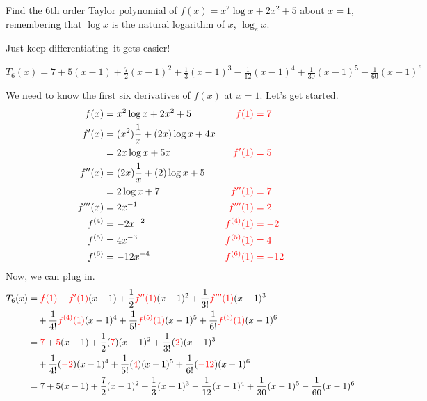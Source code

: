 \begin{Mquestion}
Find the 6th order Taylor polynomial of $f(x)=x^2\log x+2x^2+5$ about $x=1$, remembering that $\log x$ is the natural logarithm of $x$, $\log_ex$.
\end{Mquestion}
\begin{hint}
Just keep differentiating--it gets easier!
\end{hint}
\begin{answer}
$T_6(x)=7+5(x-1)+\frac{7}{2}(x-1)^2+\frac{1}{3}(x-1)^3-\frac{1}{12}(x-1)^4+\frac{1}{30}(x-1)^5-\frac{1}{60}(x-1)^6
$
\end{answer}
\begin{solution}
We need to know the first six derivatives of $f(x)$ at $x=1$. Let's get started.
\begin{align*}
f(x)&=x^2\log x + 2x^2+5 & \color{red}f(1)&\color{red}=7\\
f'(x)&=(x^2)\frac{1}{x}+(2x)\log x + 4x \\
&=2x\log x + 5x& \color{red}f'(1)&\color{red}=5\\
f''(x)&=(2x)\frac{1}{x}+(2)\log x + 5\\
&=2\log x + 7& \color{red}f''(1)&\color{red}=7\\
f'''(x)&=2x^{-1}& \color{red}f'''(1)&\color{red}=2\\
f^{(4)}&=-2x^{-2}& \color{red}f^{(4)}(1)&\color{red}=-2\\
f^{(5)}&=4x^{-3}& \color{red}f^{(5)}(1)&\color{red}=4\\
f^{(6)}&=-12x^{-4}& \color{red}f^{(6)}(1)&\color{red}=-12
\end{align*}
Now, we can plug in.
\begin{align*}
T_6(x)&=\textcolor{red}{f(1)}+\textcolor{red}{f'(1)}(x-1)+\frac{1}{2}\textcolor{red}{f''(1)}(x-1)^2+\frac{1}{3!}\textcolor{red}{f'''(1)}(x-1)^3\\
&\quad
+\frac{1}{4!}\textcolor{red}{f^{(4)}(1)}(x-1)^4
+\frac{1}{5!}\textcolor{red}{f^{(5)}(1)}(x-1)^5
+\frac{1}{6!}\textcolor{red}{f^{(6)}(1)}(x-1)^6\\
&=\textcolor{red}{7}+\textcolor{red}{5}(x-1)+\frac{1}{2}(\textcolor{red}{7})(x-1)^2
+\frac{1}{3!}(\textcolor{red}{2})(x-1)^3\\
&\quad+\frac{1}{4!}(\textcolor{red}{-2})(x-1)^4
+\frac{1}{5!}(\textcolor{red}{4})(x-1)^5
+\frac{1}{6!}(\textcolor{red}{-12})(x-1)^6\\
&=7+5(x-1)+\frac{7}{2}(x-1)^2+\frac{1}{3}(x-1)^3-\frac{1}{12}(x-1)^4+\frac{1}{30}(x-1)^5-\frac{1}{60}(x-1)^6
\end{align*}
\end{solution}




